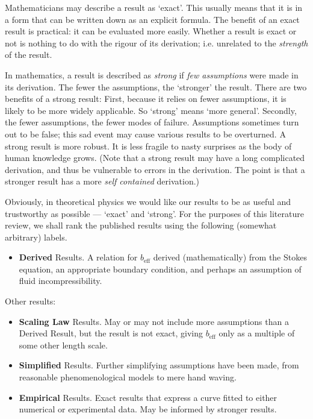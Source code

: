\documentclass[12pt, a4paper, twoside, openright]{book}
\newcommand{\beff}{\ensuremath{b_{\mathrm{eff}}}}
\begin{document}
Mathematicians may describe a result as `exact'.  This usually means that it is in a form that can be written down as an explicit formula.  The benefit of an exact result is practical: it can be evaluated more easily.  Whether a result is exact or not is nothing to do with the rigour of its derivation; i.e. unrelated to the \emph{strength} of the result. 

In mathematics, a result is described as \emph{strong} if \emph{few assumptions} were made in its derivation.  The fewer the assumptions, the `stronger' the result.
There are two benefits of a strong result: First, because it relies on fewer assumptions, it is likely to be more widely applicable.  So `strong' means `more general'.  Secondly, the fewer assumptions, the fewer modes of failure.  Assumptions sometimes turn out to be false; this sad event may cause various results to be overturned.  A strong result is more robust.  It is less fragile to nasty surprises as the body of human knowledge grows.  (Note that a strong result may have a long complicated derivation, and thus be vulnerable to errors in the derivation.  The point is that a stronger result has a more \emph{self contained} derivation.)

\clearpage
Obviously, in theoretical physics we would like our results to be as useful and trustworthy as possible --- `exact' and `strong'.  For the purposes of this literature review, we shall rank the published results using the following (somewhat arbitrary) labels.

\begin{itemize}

\item \textbf{Derived} Results.  A relation for $\beff$ derived (mathematically) from the Stokes equation, an appropriate boundary condition, and perhaps an assumption of fluid incompressibility.

\end{itemize}

Other results:

\begin{itemize}

\item \textbf{Scaling Law} Results.  May or may not include more assumptions than a Derived Result, but the result is not exact, giving $\beff$ only as a multiple of some other length scale.

\item \textbf{Simplified} Results.  Further simplifying assumptions have been made, from reasonable phenomenological models to mere hand waving.

\item \textbf{Empirical} Results.  Exact results that express a curve fitted to either numerical or experimental data.  May be informed by stronger results.

\end{itemize}
\end{document}
